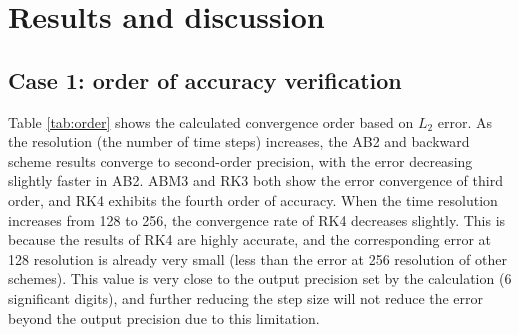\documentclass{article}
\begin{document}
\section{Results and discussion}
\label{sec:results}

\subsection{Case 1: order of accuracy verification}

Table \ref{tab:order} shows the calculated convergence order based on $L_2$ error. As the resolution (the number of time steps) increases, the AB2 and backward scheme results converge to second-order precision, with the error decreasing slightly faster in AB2. ABM3 and RK3 both show the error convergence of third order, and RK4 exhibits the fourth order of accuracy. When the time resolution increases from 128 to 256, the convergence rate of RK4 decreases slightly. This is because the results of RK4 are highly accurate, and the corresponding error at 128 resolution is already very small (less than the error at 256 resolution of other schemes). This value is very close to the output precision set by the calculation (6 significant digits), and further reducing the step size will not reduce the error beyond the output precision due to this limitation.
\end{document}

